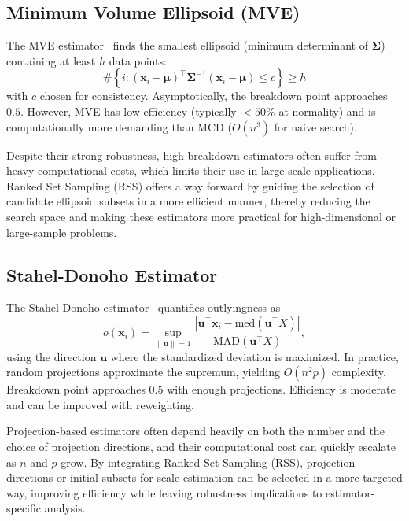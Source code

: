 \documentclass[12pt]{article}
\begin{document}
\subsection{Minimum Volume Ellipsoid (MVE)}
The MVE estimator~\cite{rousseeuw1985multivariate} finds the smallest ellipsoid (minimum determinant of $\bm{\Sigma}$) containing at least $h$ data points:
\[
\#\left\{ i : (\mathbf{x}_i - \bm{\mu})^\top \bm{\Sigma}^{-1} (\mathbf{x}_i - \bm{\mu}) \leq c \right\} \geq h
\]
with $c$ chosen for consistency.
Asymptotically, the breakdown point approaches $0.5$. However, MVE has low efficiency (typically $<50\%$ at normality) and is computationally more demanding than MCD ($O(n^3)$ for naive search).

Despite their strong robustness, high-breakdown estimators often suffer from heavy computational costs, which limits their use in large-scale applications. Ranked Set Sampling (RSS) offers a way forward by guiding the selection of candidate ellipsoid subsets in a more efficient manner, thereby reducing the search space and making these estimators more practical for high-dimensional or large-sample problems.
\subsection{Stahel-Donoho Estimator}
The Stahel-Donoho estimator~\cite{maronna2019robust} quantifies outlyingness as
\[
o(\mathbf{x}_i) = \sup_{\|\mathbf{u}\| = 1} \frac{|\mathbf{u}^\top \mathbf{x}_i - \text{med}(\mathbf{u}^\top X)|}{\text{MAD}(\mathbf{u}^\top X)},
\]
using the direction $\mathbf{u}$ where the standardized deviation is maximized. In practice, random projections approximate the supremum, yielding $O(n^2p)$ complexity.
Breakdown point approaches $0.5$ with enough projections. Efficiency is moderate and can be improved with reweighting.

Projection-based estimators often depend heavily on both the number and the choice of projection directions, and their computational cost can quickly escalate as $n$ and $p$ grow. By integrating Ranked Set Sampling (RSS), projection directions or initial subsets for scale estimation can be selected in a more targeted way, improving efficiency while leaving robustness implications to estimator-specific analysis.
\end{document}
